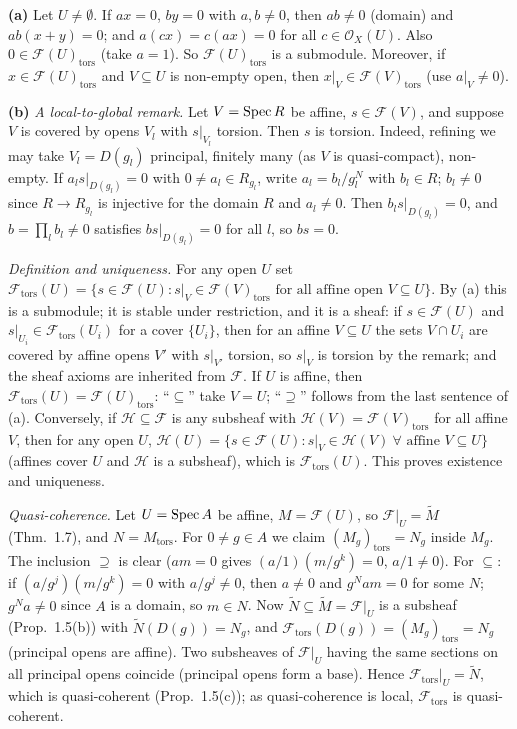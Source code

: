 \documentclass[11pt]{article}
\begin{document}
\textbf{(a)} Let $U\neq\emptyset$. If $ax=0$, $by=0$ with $a,b\neq0$, then $ab\neq0$ (domain) and $ab(x+y)=0$; and $a(cx)=c(ax)=0$ for all $c\in\mathcal O_X(U)$. Also $0\in\mathcal F(U)_{\operatorname{tors}}$ (take $a=1$). So $\mathcal F(U)_{\operatorname{tors}}$ is a submodule. Moreover, if $x\in\mathcal F(U)_{\operatorname{tors}}$ and $V\subseteq U$ is non-empty open, then $x|_V\in\mathcal F(V)_{\operatorname{tors}}$ (use $a|_V\neq0$).

\textbf{(b)} \emph{A local-to-global remark.} Let $V=\operatorname{Spec} R$ be affine, $s\in\mathcal F(V)$, and suppose $V$ is covered by opens $V_l$ with $s|_{V_l}$ torsion. Then $s$ is torsion. Indeed, refining we may take $V_l=D(g_l)$ principal, finitely many (as $V$ is quasi-compact), non-empty. If $a_ls|_{D(g_l)}=0$ with $0\neq a_l\in R_{g_l}$, write $a_l=b_l/g_l^N$ with $b_l\in R$; $b_l\neq0$ since $R\to R_{g_l}$ is injective for the domain $R$ and $a_l\ne 0$. Then $b_ls|_{D(g_l)}=0$, and $b=\prod_lb_l\neq0$ satisfies $bs|_{D(g_l)}=0$ for all $l$, so $bs=0$.

\emph{Definition and uniqueness.} For any open $U$ set $\mathcal F_{\operatorname{tors}}(U)=\{s\in\mathcal F(U):s|_V\in\mathcal F(V)_{\operatorname{tors}}\text{ for all affine open }V\subseteq U\}$. By (a) this is a submodule; it is stable under restriction, and it is a sheaf: if $s\in\mathcal F(U)$ and $s|_{U_i}\in\mathcal F_{\operatorname{tors}}(U_i)$ for a cover $\{U_i\}$, then for an affine $V\subseteq U$ the sets $V\cap U_i$ are covered by affine opens $V'$ with $s|_{V'}$ torsion, so $s|_V$ is torsion by the remark; and the sheaf axioms are inherited from $\mathcal F$. If $U$ is affine, then $\mathcal F_{\operatorname{tors}}(U)=\mathcal F(U)_{\operatorname{tors}}$: ``$\subseteq$'' take $V=U$; ``$\supseteq$'' follows from the last sentence of (a). Conversely, if $\mathcal H\subseteq\mathcal F$ is any subsheaf with $\mathcal H(V)=\mathcal F(V)_{\operatorname{tors}}$ for all affine $V$, then for any open $U$, $\mathcal H(U)=\{s\in\mathcal F(U):s|_V\in\mathcal H(V)\ \forall\text{ affine }V\subseteq U\}$ (affines cover $U$ and $\mathcal H$ is a subsheaf), which is $\mathcal F_{\operatorname{tors}}(U)$. This proves existence and uniqueness.

\emph{Quasi-coherence.} Let $U=\operatorname{Spec} A$ be affine, $M=\mathcal F(U)$, so $\mathcal F|_U=\widetilde M$ (Thm.~1.7), and $N=M_{\operatorname{tors}}$. For $0\neq g\in A$ we claim $(M_g)_{\operatorname{tors}}=N_g$ inside $M_g$. The inclusion $\supseteq$ is clear ($am=0$ gives $(a/1)(m/g^k)=0$, $a/1\neq0$). For $\subseteq$: if $(a/g^j)(m/g^k)=0$ with $a/g^j\neq0$, then $a\neq0$ and $g^Nam=0$ for some $N$; $g^Na\neq0$ since $A$ is a domain, so $m\in N$. Now $\widetilde N\subseteq\widetilde M=\mathcal F|_U$ is a subsheaf (Prop.~1.5(b)) with $\widetilde N(D(g))=N_g$, and $\mathcal F_{\operatorname{tors}}(D(g))=(M_g)_{\operatorname{tors}}=N_g$ (principal opens are affine). Two subsheaves of $\mathcal F|_U$ having the same sections on all principal opens coincide (principal opens form a base). Hence $\mathcal F_{\operatorname{tors}}|_U=\widetilde N$, which is quasi-coherent (Prop.~1.5(c)); as quasi-coherence is local, $\mathcal F_{\operatorname{tors}}$ is quasi-coherent.
\end{document}
